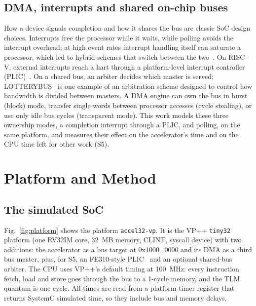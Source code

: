 \documentclass[conference]{IEEEtran}
\begin{document}
\subsection{DMA, interrupts and shared on-chip buses}
How a device signals completion and how it shares the bus are classic SoC design choices. Interrupts free the processor while it waits, while polling avoids the interrupt overhead; at high event rates interrupt handling itself can saturate a processor, which led to hybrid schemes that switch between the two~\cite{livelock}. On RISC-V, external interrupts reach a hart through a platform-level interrupt controller (PLIC)~\cite{riscv_priv,fe310}. On a shared bus, an arbiter decides which master is served; LOTTERYBUS~\cite{lotterybus} is one example of an arbitration scheme designed to control how bandwidth is divided between masters. A DMA engine can own the bus in burst (block) mode, transfer single words between processor accesses (cycle stealing), or use only idle bus cycles (transparent mode). This work models these three ownership modes, a completion interrupt through a PLIC, and polling, on the same platform, and measures their effect on the accelerator's time and on the CPU time left for other work (S5).

\section{Platform and Method}
\subsection{The simulated SoC}
Fig.~\ref{fig:platform} shows the platform \texttt{accel32-vp}. It is the VP++ \texttt{tiny32} platform (one RV32IM core, 32~MB memory, CLINT, syscall device) with two additions: the accelerator as a bus target at 0x1000\_0000 and its DMA as a third bus master, plus, for S5, an FE310-style PLIC~\cite{fe310} and an optional shared-bus arbiter. The CPU uses VP++'s default timing at 100~MHz: every instruction fetch, load and store goes through the bus to a 1-cycle memory, and the TLM quantum is one cycle. All times are read from a platform timer register that returns SystemC simulated time, so they include bus and memory delays.
\end{document}
